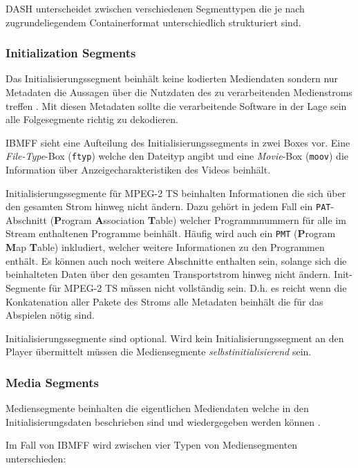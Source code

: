 \documentclass[paper = a4, fontsize = 12pt, parskip = half]{scrartcl} %
\def\attr#1{\texttt{#1}}
\begin{document}
DASH unterscheidet zwischen verschiedenen Segmenttypen die je nach zugrundeliegendem Containerformat unterschiedlich strukturiert sind.

\subsubsection{Initialization Segments}
Das Initialisierungssegment beinhält keine kodierten Mediendaten sondern nur Metadaten die Aussagen über die Nutzdaten des zu verarbeitenden Medienstroms treffen \cite{international_organization_for_standardization_isoiec_nodate}. Mit diesen Metadaten sollte die verarbeitende Software in der Lage sein alle Folgesegmente richtig zu dekodieren.

IBMFF sieht eine Aufteilung des Initialisierungssegments in zwei Boxes vor. Eine \textit{File-Type}-Box (\attr{ftyp}) welche den Dateityp angibt und eine \textit{Movie}-Box (\attr{moov}) die Information über Anzeigecharakteristiken des Videos beinhält.

Initialisierungssegmente für MPEG-2 TS beinhalten Informationen die sich über den gesamten Strom hinweg nicht ändern. Dazu gehört in jedem Fall ein \attr{PAT}-Abschnitt (\textbf{P}rogram \textbf{A}ssociation \textbf{T}able) welcher Programmnummern für alle im Stream enthaltenen Programme beinhält. Häufig wird auch ein \attr{PMT} (\textbf{P}rogram \textbf{M}ap \textbf{T}able) inkludiert, welcher weitere Informationen zu den Programmen enthält. Es können auch noch weitere Abschnitte enthalten sein, solange sich die beinhalteten Daten über den gesamten Transportstrom hinweg nicht ändern.
Init-Segmente für MPEG-2 TS müssen nicht vollständig sein. D.h. es reicht wenn die Konkatenation aller Pakete des Stroms alle Metadaten beinhält die für das Abspielen nötig sind.

Initialisierungssegmente sind optional. Wird kein Initialisierungssegment an den Player übermittelt müssen die Mediensegmente \textit{selbstinitialisierend} sein.

\subsubsection{Media Segments}
Mediensegmente beinhalten die eigentlichen Mediendaten welche in den Initialisierungsdaten beschrieben sind und wiedergegeben werden können \cite{international_organization_for_standardization_isoiec_nodate}.

Im Fall von IBMFF wird zwischen vier Typen von Mediensegmenten unterschieden:
\end{document}
